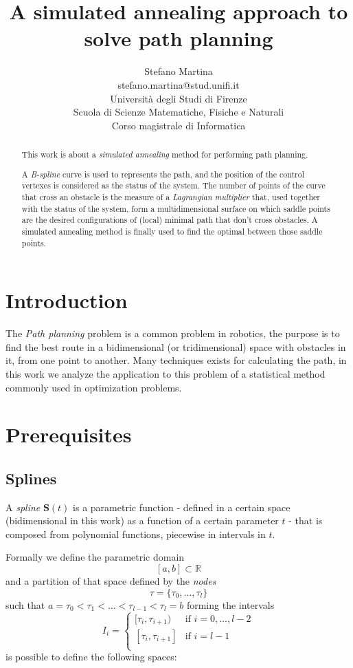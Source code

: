\documentclass[a4paper]{article}
\author{
  {\Large Stefano Martina}\\
  {\small stefano.martina@stud.unifi.it}\\
  Universit\`a degli Studi di Firenze\\
  Scuola di Scienze Matematiche, Fisiche e Naturali\\
  Corso magistrale di Informatica
}
\title{{\Huge\bfseries A simulated annealing approach to solve path
    planning}}%
\newcommand{\mR}{\ensuremath{\mathbb{R}}}
\begin{document}
\maketitle
\thispagestyle{empty}
\vfill
\begin{abstract}
  This work is about a \emph{simulated annealing} method for performing path
  planning.

  A \emph{B-spline} curve is used to represents the path, and the
  position of the control vertexes is considered as the status of the
  system. The number of points of the curve that cross an obstacle
  is the measure of a \emph{Lagrangian multiplier} that, used together with
  the status of the system, form a multidimensional surface on which
  saddle points are the desired configurations of (local) minimal path that
  don't cross obstacles. A simulated annealing method is finally used
  to find the optimal between those saddle points.
\end{abstract}
\newpage
\section{Introduction}
The \emph{Path planning} problem is a common problem in robotics, the
purpose is to find the best route in a bidimensional (or
tridimensional) space with obstacles in it, from one point to
another. Many techniques exists for calculating the path, in this work
we analyze the application to this problem of a statistical method
commonly used in optimization problems.

\section{Prerequisites}

\subsection{Splines}\label{sec:spline}
A \emph{spline} $\mathbf{S}(t)$ is a parametric function - defined in a certain space
(bidimensional in this work) as a
function of a certain parameter $t$ - that is composed from polynomial
functions, piecewise in intervals in $t$.

Formally we define the parametric domain
$$[a,b]\subset\mR$$
and a partition of that space defined by the \emph{nodes}
$$\tau = \{\tau_0,\dots,\tau_l\}$$
such that $a=\tau_0<\tau_1<\dots<\tau_{l-1}<\tau_l=b$ forming the
intervals
$$
I_i=
\begin{cases}
  [\tau_i,\tau_{i+1}) & \mbox{if } i=0,\dots,l-2\\
    [\tau_i,\tau_{i+1}] & \mbox{if } i=l-1\\
\end{cases}
$$
is possible to define the following spaces:
\end{document}
